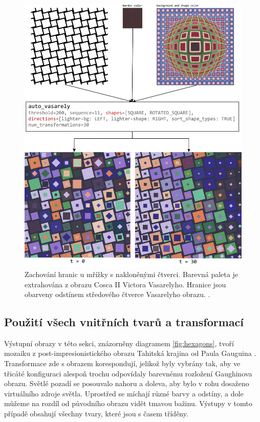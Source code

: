 \begin{figure}[H]
    \centering
    \includegraphics[width=\textwidth]{obrazky-figures/tilted_squares.pdf}
    \caption{Zachování hranic u mřížky s nakloněnými čtverci. Barevná paleta je extrahována z obrazu Cosca II Victora Vasarelyho. Hranice jsou obarveny odstínem středového čtverce Vasarelyho obrazu. \cite{cosca2}. }
    \label{fig:tilted_squares}
\end{figure}

\subsection*{Použití všech vnitřních tvarů a transformací}

Výstupní obrazy v této sekci, znázorněny diagramem \ref{fig:hexagons}, tvoří mozaiku \linebreak z post-impresionistického obrazu Tahitská krajina od Paula Gauguina  \cite{tahiti}. Transformace zde s obrazem korespondují, jelikož byly vybrány tak, aby ve třicáté konfiguraci alespoň trochu odpovídaly barevnému rozložení Gaughinova obrazu. Světlé pozadí se posouvalo nahoru a doleva, aby bylo v rohu dosaženo virtuálního zdroje světla. Uprostřed se míchají různé barvy a odstíny, a dole můžeme na rozdíl od původního obrazu vidět tmavou bažinu. Výstupy v tomto případě obsahují všechny tvary, které jsou s časem tříděny. 

